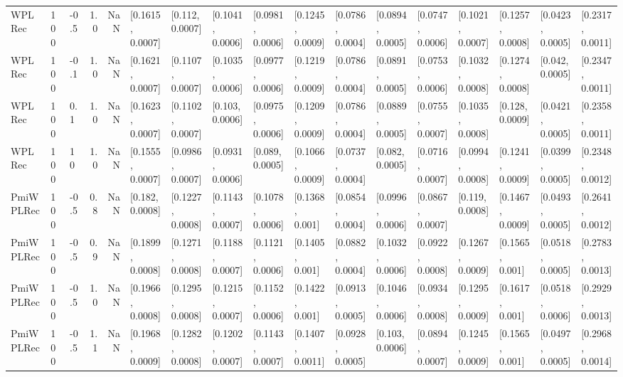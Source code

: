 \begin{tabular}{lllrrllllllllllll}
    WPLRec &  100 &  -0.5 &   1.0 &   NaN &  [0.1615, 0.0007] &   [0.112, 0.0007] &  [0.1041, 0.0006] &  [0.0981, 0.0006] &  [0.1245, 0.0009] &  [0.0786, 0.0004] &  [0.0894, 0.0005] &  [0.0747, 0.0006] &  [0.1021, 0.0007] &  [0.1257, 0.0008] &  [0.0423, 0.0005] &  [0.2317, 0.0011] \\
    WPLRec &  100 &  -0.1 &   1.0 &   NaN &  [0.1621, 0.0007] &  [0.1107, 0.0007] &  [0.1035, 0.0006] &  [0.0977, 0.0006] &  [0.1219, 0.0009] &  [0.0786, 0.0004] &  [0.0891, 0.0005] &  [0.0753, 0.0006] &  [0.1032, 0.0008] &  [0.1274, 0.0008] &   [0.042, 0.0005] &  [0.2347, 0.0011] \\
    WPLRec &  100 &   0.1 &   1.0 &   NaN &  [0.1623, 0.0007] &  [0.1102, 0.0007] &   [0.103, 0.0006] &  [0.0975, 0.0006] &  [0.1209, 0.0009] &  [0.0786, 0.0004] &  [0.0889, 0.0005] &  [0.0755, 0.0007] &  [0.1035, 0.0008] &   [0.128, 0.0009] &  [0.0421, 0.0005] &  [0.2358, 0.0011] \\
    WPLRec &  100 &    10 &   1.0 &   NaN &  [0.1555, 0.0007] &  [0.0986, 0.0007] &  [0.0931, 0.0006] &   [0.089, 0.0005] &  [0.1066, 0.0009] &  [0.0737, 0.0004] &   [0.082, 0.0005] &  [0.0716, 0.0007] &  [0.0994, 0.0008] &  [0.1241, 0.0009] &  [0.0399, 0.0005] &  [0.2348, 0.0012] \\
 PmiWPLRec &  100 &  -0.5 &   0.8 &   NaN &   [0.182, 0.0008] &  [0.1227, 0.0008] &  [0.1143, 0.0007] &  [0.1078, 0.0006] &   [0.1368, 0.001] &  [0.0854, 0.0004] &  [0.0996, 0.0006] &  [0.0867, 0.0007] &   [0.119, 0.0008] &  [0.1467, 0.0009] &  [0.0493, 0.0005] &  [0.2641, 0.0012] \\
 PmiWPLRec &  100 &  -0.5 &   0.9 &   NaN &  [0.1899, 0.0008] &  [0.1271, 0.0008] &  [0.1188, 0.0007] &  [0.1121, 0.0006] &   [0.1405, 0.001] &  [0.0882, 0.0004] &  [0.1032, 0.0006] &  [0.0922, 0.0008] &  [0.1267, 0.0009] &   [0.1565, 0.001] &  [0.0518, 0.0005] &  [0.2783, 0.0013] \\
 PmiWPLRec &  100 &  -0.5 &   1.0 &   NaN &  [0.1966, 0.0008] &  [0.1295, 0.0008] &  [0.1215, 0.0007] &  [0.1152, 0.0006] &   [0.1422, 0.001] &  [0.0913, 0.0005] &  [0.1046, 0.0006] &  [0.0934, 0.0008] &  [0.1295, 0.0009] &   [0.1617, 0.001] &  [0.0518, 0.0006] &  [0.2929, 0.0013] \\
 PmiWPLRec &  100 &  -0.5 &   1.1 &   NaN &  [0.1968, 0.0009] &  [0.1282, 0.0008] &  [0.1202, 0.0007] &  [0.1143, 0.0007] &  [0.1407, 0.0011] &  [0.0928, 0.0005] &   [0.103, 0.0006] &  [0.0894, 0.0007] &  [0.1245, 0.0009] &   [0.1565, 0.001] &  [0.0497, 0.0005] &  [0.2968, 0.0014] \\

\end{tabular}
